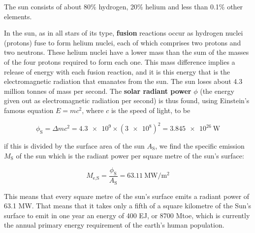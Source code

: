 \documentclass[class=scrartcl, crop=false,parskip=half,]{standalone}
\begin{document}
The sun consists of about 80\% hydrogen, 20\% helium and less than 0.1\% other elements.

In the sun, as in all stars of its type, \textbf{fusion} reactions occur as hydrogen nuclei (protons) fuse to form helium nuclei, each of which comprises two protons and two neutrons. These helium nuclei have a lower mass than the sum of the masses of the four protons required to form each one. This mass difference implies a release of energy with each fusion reaction, and it is this energy that is the electromagnetic radiation that emanates from the sun. The sun loses about 4.3 million tonnes of mass per second. The \textbf{solar radiant power} $\phi$ (the energy given out as electromagnetic radiation per second) is thus found, using Einstein's famous equation $E=mc^2$, where $c$ is the speed of light, to be


\begin{equation}\label{eq:solarRadiantPower}
    \phi_\mathrm{S}=\Delta mc^2=\num{4.3e9}\times\left(\num{3e8}\right)^2=\SI{3.845e26}{\watt}
\end{equation}

if this is divided by the surface area of the sun $A_\text{S}$, we find the specific emission $M_\text{S}$ of the sun which is the radiant power per square metre of the sun's surface:

\begin{equation}\label{eq:specificEmission}
    M_{\text{e,S}}=\frac{\phi_{\text{S}}}{A_{\text{S}}}=\SI{63.11}{\mega\watt\per\metre\squared}
\end{equation}

This means that every square metre of the sun's surface emits a  radiant power of 63.1 MW. That means that it takes only a fifth of a square kilometre of the Sun's surface to emit in one year an energy of 400 EJ, or 8700 Mtoe, which is currently the annual primary energy requirement of the earth's human population.%
\end{document}
